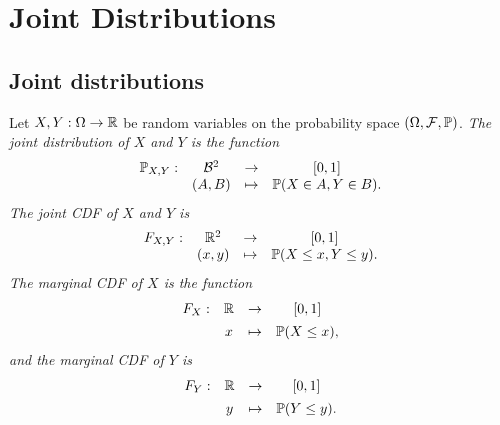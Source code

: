 \chapter{Joint Distributions}\label{chap:joint}
\section{Joint distributions}

\begin{definition}
Let $X,Y:\Omega\to\mathbb{R}$ be random variables on the probability space $(\Omega,\mathcal{F},\mathbb{P})$.
\ben
\it %
The \emph{joint distribution} of $X$ and $Y$ is the function
\[
\begin{array}{cccc}
\mathbb{P}_{X,Y}:		& \mathcal{B}^2	& \to		& [0,1] \\
				& (A,B)			& \mapsto	& \mathbb{P}(X\in A,Y\in B).
\end{array}
\]
\it The \emph{joint CDF} of $X$ and $Y$ is 
\[
\begin{array}{cccc}
F_{X,Y}:		& \mathbb{R}^2	& \to		& [0,1] \\
			& (x,y)	& \mapsto	& \mathbb{P}(X\leq x,Y\leq y).
\end{array}
\]
\it 
The \emph{marginal CDF} of $X$ is the function
\[
\begin{array}{cccc}
F_X:	& \mathbb{R} 	& \to		& [0,1] \\[1ex]
	& x				& \mapsto	& \mathbb{P}(X\leq x),
\end{array}
\]
and the marginal CDF of $Y$ is
\[
\begin{array}{cccc}
F_Y:	& \mathbb{R}		& \to		& [0,1] \\[1ex]
	& y				& \mapsto	& \mathbb{P}(Y\leq y).
\end{array}
\]

\een
\end{definition}


